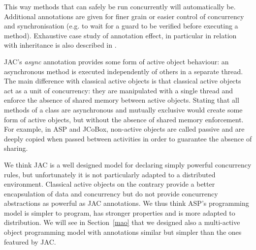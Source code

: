 This way methods that can safely be run concurrently will
automatically be. Additional annotations are given for finer grain or
easier control of concurrency and synchronisation (e.g. to wait for a
guard to be verified before executing a method).  Exhaustive case
study of annotation effect, in particular in relation with inheritance
is also described in \cite{lohr2006jac}.

JAC's \emph{async} annotation provides some form of
active object behaviour: an asynchronous method is executed
independently of others in a separate thread. The main difference with
classical active objects is that classical active objects act as a unit of
concurrency: they are manipulated with a single thread and enforce the
absence of shared memory between active objects. Stating that all
methods of a class are asynchronous and mutually exclusive would
create some form of active objects, but without the absence of shared
memory enforcement. For example, in ASP and JCoBox, non-active objects
are called passive and are deeply copied when passed between
activities in order to guarantee the absence of sharing.

\smallskip We think JAC is a well designed model for declaring simply
powerful concurrency rules, but unfortunately it is not particularly
adapted to a distributed environment. Classical active objects on the
contrary provide a better encapsulation of data and concurrency but do
not provide concurrency abstractions as powerful as JAC annotations.
We thus think ASP's programming model is simpler to program, has
stronger properties and is more adapted to distribution. We will see
in Section~\ref{mao} that we designed also a multi-active object
programming model with annotations similar but simpler than the ones
featured by JAC.





